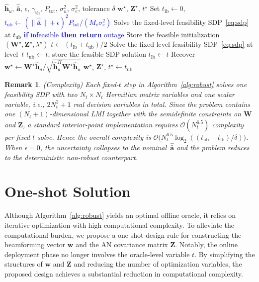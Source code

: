 \documentclass[journal]{IEEEtran}
\newtheorem{remark}{Remark}
\begin{document}
\begin{algorithm}[t]
\caption{Bisection-Based Optimal Solution}
\label{alg:robust}
\begin{algorithmic}[1]
\renewcommand{\algorithmicrequire}{\textbf{Input:}}
\renewcommand{\algorithmicensure}{\textbf{Output:}}
\REQUIRE $\hat{\mathbf{h}}_u$, $\hat{\bar{\mathbf{a}}}$, $\epsilon$, $\gamma_{\mathrm{th}}$, $P_{\mathrm{tot}}$, $\sigma_u^2$, $\sigma_e^2$, tolerance $\delta$
\ENSURE $\mathbf{w}^\star$, $\mathbf{Z}^\star$, $t^\star$
\STATE Set $t_{\mathrm{lb}}\!\leftarrow\!0$,\; \textcolor{blue}{$t_{\mathrm{ub}}\!\leftarrow (\|\hat{\bar{\mathbf{a}}}\|\!+\!\epsilon)^2 P_{\mathrm{tot}}/(M_e\sigma_e^2)$}
\STATE Solve the fixed-level feasibility SDP~\eqref{eq:sdp} at $t_{\mathrm{ub}}$
\STATE \textcolor{blue}{\textbf{if} infeasible \textbf{then return} outage}
\STATE Store the feasible initialization $(\mathbf{W}^\star,\mathbf{Z}^\star,\lambda^\star)$
\STATE $t\leftarrow (t_{\mathrm{lb}}+t_{\mathrm{ub}})/2$
\STATE Solve the fixed-level feasibility SDP~\eqref{eq:sdp} at level~$t$
\STATE $t_{\mathrm{ub}}\leftarrow t$;\; store the feasible SDP solution
\ELSE
\STATE $t_{\mathrm{lb}}\leftarrow t$
\ENDIF
\ENDWHILE
\STATE Recover $\mathbf{w}^\star\leftarrow \mathbf{W}^\star\hat{\mathbf{h}}_u/\sqrt{\hat{\mathbf{h}}_u^H\mathbf{W}^\star\hat{\mathbf{h}}_u}$
\RETURN $\mathbf{w}^\star$, $\mathbf{Z}^\star$, $t^\star\!\leftarrow\! t_{\mathrm{ub}}$
\end{algorithmic}
\end{algorithm}

\begin{remark}(Complexity)
Each fixed-$t$ step in Algorithm~\ref{alg:robust} solves one feasibility SDP with two $N_t\times N_t$ Hermitian matrix variables and one scalar variable, i.e., $2N_t^2+1$ real decision variables in total. Since the problem contains one $(N_t\!+\!1)$-dimensional LMI together with the semidefinite constraints on $\mathbf{W}$ and $\mathbf{Z}$, a standard interior-point implementation requires $\mathcal{O}(N_t^{6.5})$ complexity per fixed-$t$ solve. Hence the overall complexity is $\mathcal{O}\!\big(N_t^{6.5}\log_2((t_{\mathrm{ub}}-t_{\mathrm{lb}})/\delta)\big)$. When $\epsilon=0$, the uncertainty collapses to the nominal~$\hat{\bar{\mathbf{a}}}$ and the problem reduces to the deterministic non-robust counterpart.
\end{remark}


\section{One-shot Solution}\label{section learning design}
Although Algorithm~\ref{alg:robust} yields an optimal offline oracle, it relies on iterative optimization with high computational complexity. To alleviate the computational burden, we propose a one-shot design rule for constructing the beamforming vector $\mathbf{w}$ and the AN covariance matrix $\mathbf{Z}$. Notably, the online deployment phase no longer involves the oracle-level variable $t$. By simplifying the structures of $\mathbf{w}$ and $\mathbf{Z}$ and reducing the number of optimization variables, the proposed design achieves a substantial reduction in computational complexity.
\end{document}
